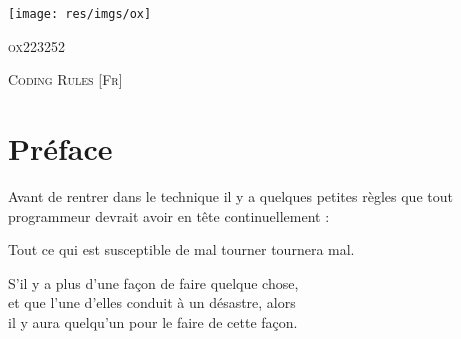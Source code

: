 \documentclass{report}
\newenvironment{extrait}[1]{\small\slshape
\savebox{\auteurbm}{\upshape\sffamily#1}
\begin{flushright}}{\\[4pt]\usebox{\auteurbm}
\end{flushright}\normalsize\upshape}
\newenvironment{extraitL}[1]{\small\slshape
\savebox{\auteurbm}{\upshape\sffamily#1}
\begin{flushleft}}{\\[4pt]\usebox{\auteurbm}
\end{flushleft}\normalsize\upshape}
\begin{document}
	\begin{titlepage}
		\begin{minipage}{0.4\textwidth}
			\begin{flushleft}
				\texttt{[image: res/imgs/ox]}
			\end{flushleft}
		\end{minipage}
		\begin{minipage}{0.4\textwidth}
			\begin{flushright}
				\begin{flushright}
					\textsc{ox223252}
				\end{flushright}
			\end{flushright}
		\end{minipage}
		\vfill
			\center\large\textsc{Coding Rules}
			\center\textsc{[Fr]}
		\vfill
		\begin{minipage}{0.4\textwidth}
			\begin{flushleft} \large
			\end{flushleft}
		\end{minipage}
		\begin{minipage}{0.4\textwidth}
			\begin{flushright}
			\end{flushright}
		\end{minipage}
	\end{titlepage}

	\tableofcontents
	\listoffigures

	\newpage
	\setcounter{page}{1}

	\chapter{Préface}
		Avant de rentrer dans le technique il y a quelques petites règles que tout programmeur devrait avoir en tête continuellement :

		\begin{extrait}{Murphy}
			Tout ce qui est susceptible de mal tourner tournera mal.
		\end{extrait}

		\begin{extraitL}{Murphy}
			S'il y a plus d'une façon de faire quelque chose,\\
			et que l'une d'elles conduit à un désastre, alors\\
			il y aura quelqu'un pour le faire de cette façon.
		\end{extraitL}
\end{document}
